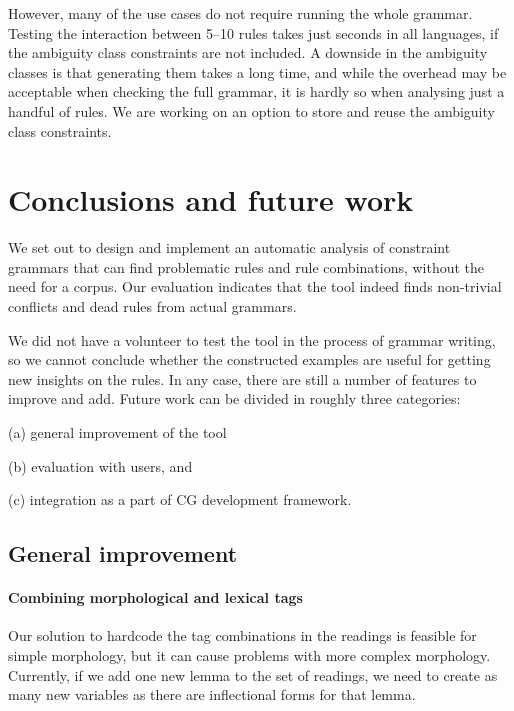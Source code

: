 {{However, many of the use cases do not require running the whole
grammar. Testing the interaction between 5--10 rules takes just
seconds in all languages, if the ambiguity class constraints are not included. 
A downside in the ambiguity classes is that generating them takes a long time, 
and while the overhead may be acceptable when checking the full grammar,
it is hardly so when analysing just a handful of rules. 
We are working on an option to store and reuse the ambiguity class constraints.

\section{Conclusions and future work}

We set out to design and implement an automatic analysis of constraint grammars that can find problematic rules and rule combinations, without the need for a corpus.
Our evaluation indicates that the tool indeed finds non-trivial conflicts and dead rules
from actual grammars. 

We did not have a volunteer to test the tool in
the process of grammar writing, so we cannot conclude whether the
constructed examples are useful for getting new insights on the rules.
In any case, there are still a number of features to improve and add.
Future work can be divided in roughly three categories: 
\begin{inparaenum}
\item[(a)] general improvement of the tool
\item[(b)] evaluation with users, and 
\item[(c)] integration as a part of CG development framework.
\end{inparaenum}

\subsection{General improvement}

\paragraph{Combining morphological and lexical tags}

Our solution to hardcode the tag combinations in the readings is
feasible for simple morphology, but it can cause problems with more
complex morphology.
Currently, if we add one new lemma to the set of readings, we need to
create as many new variables as there are inflectional forms
for that lemma. %

}}

